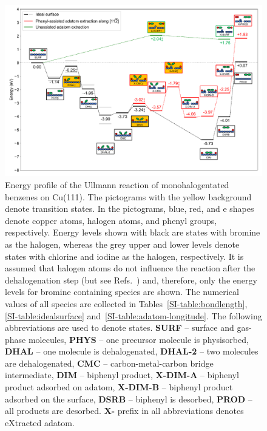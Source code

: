 \documentclass[aps,prb,amsmath,amssymb,11pt]{revtex4-1}
\newcommand{\zhzh}{\color{blue}}
\begin{document}
\begin{figure}[bt]
\centering
\includegraphics[width=1.\textwidth]{Fig/main-profile.pdf}
\caption{
Energy profile of the Ullmann reaction of monohalogentated benzenes on Cu(111). {\zhzh The pictograms with the yellow background denote transition states.} In the pictograms, blue, red, and e shapes denote copper atoms, halogen atoms, and phenyl groups, respectively. %
Energy levels shown with black are states with bromine as the halogen, whereas the grey upper and lower levels denote states with chlorine and iodine as the halogen, respectively. It is assumed that halogen atoms do not influence the reaction after the dehalogenation step (but see Refs.~) and, therefore, only the energy levels for bromine containing species are shown. The numerical values of all species are collected in Tables~\ref{SI-table:bondlength}, \ref{SI-table:idealsurface} and~\ref{SI-table:adatom-longitude}. {\zhzh The following abbreviations are used to denote states. \textbf{SURF} -- surface and gas-phase molecules, \textbf{PHYS} -- one precursor molecule is physisorbed, \textbf{DHAL} -- one molecule is dehalogenated, \textbf{DHAL-2} -- two molecules are dehalogenated, \textbf{CMC} -- carbon-metal-carbon bridge intermediate, \textbf{DIM} -- biphenyl product, \textbf{X-DIM-A} -- biphenyl product adsorbed on adatom, \textbf{X-DIM-B} -- biphenyl product adsorbed on the surface, \textbf{DSRB} --  biphenyl is desorbed, \textbf{PROD} -- all products are desorbed. \textbf{X-} prefix in all abbreviations denotes eXtracted adatom.}}
\label{fig:completeenergy}
\end{figure}
\end{document}

